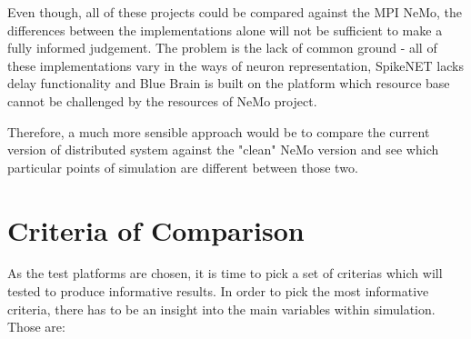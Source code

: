 Even though, all of these projects could be compared against the MPI NeMo, the differences between the implementations alone will not be sufficient to make a fully informed judgement. The problem is the lack of common ground - all of these implementations vary in the ways of neuron representation, SpikeNET lacks delay functionality and Blue Brain is built on the platform which resource base cannot be challenged by the resources of NeMo project.

Therefore, a much more sensible approach would be to compare the current version of distributed system against the "clean" NeMo version and see which particular points of simulation are different between those two.

\section{Criteria of Comparison}

As the test platforms are chosen, it is time to pick a set of criterias which will tested to produce informative results. In order to pick the most informative criteria, there has to be an insight into the main variables within simulation. Those are:

